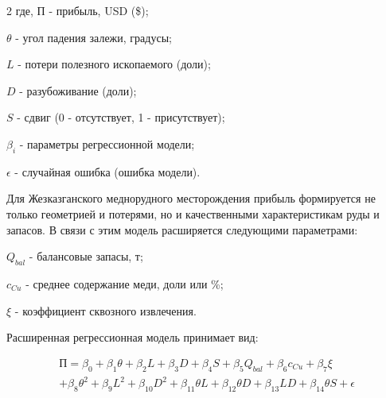 \begin{multicols}{2}
где, \(П\) - прибыль, USD (\$);

\(\theta\) - угол падения залежи, градусы;

\(L\) - потери полезного ископаемого (доли);

\(D\) - разубоживание (доли);

\(S\) - сдвиг (0 - отсутствует, 1 - присутствует);

\(\beta_{i}\) - параметры регрессионной модели;

\(\epsilon\) - случайная ошибка (ошибка модели).

Для Жезказганского меднорудного месторождения прибыль формируется не
только геометрией и потерями, но и качественными характеристикам руды и
запасов. В связи с этим модель расширяется следующими параметрами:

\(Q_{bal}\) - балансовые запасы, т;

\(c_{Cu}\) - среднее содержание меди, доли или \%;

\(\xi\) - коэффициент сквозного извлечения.

Расширенная регрессионная модель принимает вид:
\end{multicols}
\vspace{-1cm}
\begin{multline}
П = \beta_{0} + \beta_{1}\theta + \beta_{2}L + \beta_{3}D + \beta_{4}S + \beta_{5}Q_{bal} + \beta_{6}c_{Cu} + \beta_{7}\xi \\
+ \beta_{8}\theta^{2} + \beta_{9}L^{2} + \beta_{10}D^{2} + \beta_{11}\theta L + \beta_{12}\theta D + \beta_{13}LD + \beta_{14}\theta S + \epsilon
\end{multline}


